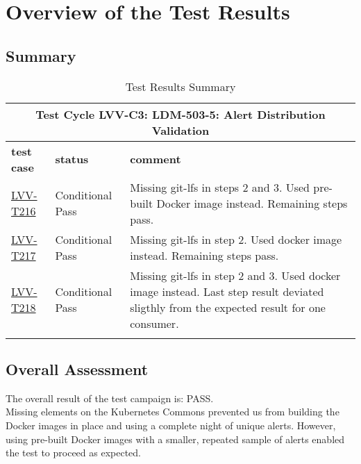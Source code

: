 \documentclass[DM,lsstdraft,STR,toc]{lsstdoc}
\begin{document}
\newpage

\section{Overview of the Test Results}
\label{sect:overview}

\subsection{Summary}
\label{sect:summarytable}

\begin{longtable} {p{}p{}p{}}
\toprule
  \multicolumn{3}{c}{ Test Cycle {\bf LVV-C3: LDM-503-5: Alert Distribution Validation }} \\\hline
  {\bf \footnotesize test case} & {\bf \footnotesize status} & {\bf \footnotesize comment} \\\toprule
    \href{https://jira.lsstcorp.org/secure/Tests.jspa#/testCase/LVV-T216}{LVV-T216} 
    & Conditional Pass & Missing git-lfs in steps 2 and 3. Used pre-built Docker image instead.
Remaining steps pass.

    \\\hline
    \href{https://jira.lsstcorp.org/secure/Tests.jspa#/testCase/LVV-T217}{LVV-T217} 
    & Conditional Pass & Missing git-lfs in step 2. Used docker image instead. Remaining steps
pass.

    \\\hline
    \href{https://jira.lsstcorp.org/secure/Tests.jspa#/testCase/LVV-T218}{LVV-T218} 
    & Conditional Pass & Missing git-lfs in step 2 and 3. Used docker image instead. Last step
result deviated sligthly from the expected result for one consumer.

    \\\hline

\caption{Test Results Summary}
\label{table:summary}
\end{longtable}

\subsection{Overall Assessment}
\label{sect:overallassessment}

The overall result of the test campaign is:
PASS.\\[2\baselineskip]Missing elements on the Kubernetes Commons
prevented us from building the Docker images in place and using a
complete night of unique alerts. However, using pre-built Docker images
with a smaller, repeated sample of alerts enabled the test to proceed as
expected.
\end{document}
